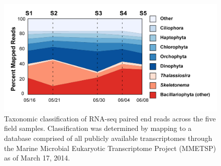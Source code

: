 \begin{figure}[h!]
  \centering
    \includegraphics[width=1\textwidth]{Images/C3_Figure1_StackPlot.png}
    \caption[Taxonomic classification of reads across five field samples]{Taxonomic classification of RNA-seq paired end reads across the five field samples. Classification was determined by mapping to a database comprised of all publicly available transcriptomes through the Marine Microbial Eukaryotic Transcriptome Project (MMETSP) as of March 17, 2014.}
  \label{fig:c3f1}
\end{figure}

